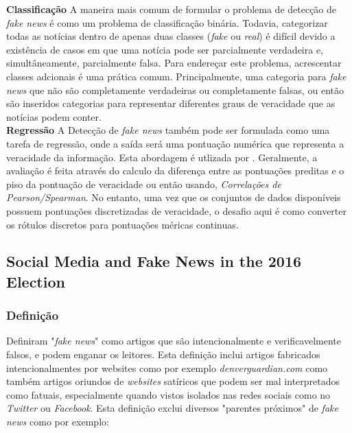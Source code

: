 \textbf{Classificação} A maneira mais comum de formular o problema de detecção de \textit{fake news} é como um problema de classificação binária. Todavia, categorizar todas as notícias dentro de apenas duas classes (\textit{fake} ou \textit{real}) é difícil devido a existência de casos em que uma notícia pode ser parcialmente verdadeira e, simultâneamente, parcialmente falsa. Para endereçar este problema, acrescentar classes adcionais é uma prática comum. Principalmente, uma categoria para \textit{fake news} que não são  completamente verdadeiras ou completamente falsas, ou então são inseridos categorias para representar diferentes graus de veracidade que as notícias podem conter. \\


\textbf{Regressão} A Detecção de \textit{fake news} também pode ser formulada como uma tarefa de regressão, onde a saída será uma pontuação numérica que representa a veracidade da informação. Esta abordagem é utlizada por \cite{nakashole2014}. Geralmente, a avaliação é feita através do calculo da diferença entre as pontuações preditas e o piso da pontuação de veracidade ou então usando, \textit{Correlações de Pearson/Spearman}. No entanto, uma vez que os conjuntos de dados disponíveis possuem pontuações discretizadas de veracidade, o desafio aqui é como converter os rótulos discretos para pontuações méricas continuas. \\


\subsection{Social Media and Fake News in the 2016 Election}

\subsubsection{Definição}

\cite{allcot2017} Definiram "\textit{fake news}" como artigos que são intencionalmente e verificavelmente falsos, e podem enganar os leitores. Esta definição inclui artigos fabricados intencionalmentes por websites como por exemplo \textit{denverguardian.com} como também artigos oriundos de \textit{websites} satíricos que podem ser mal interpretados como fatuais, especialmente quando vistos isolados nas redes sociais como no \textit{Twitter} ou \textit{Facebook}. Esta definição exclui diversos "parentes próximos" de \textit{fake news} como por exemplo:


